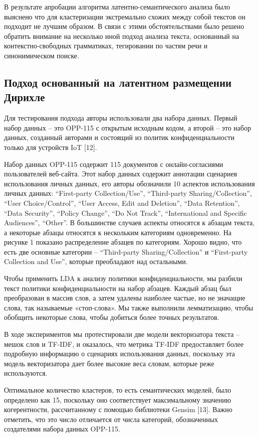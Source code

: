 \documentclass[../main]{subfiles}
\begin{document}
В результате апробации алгоритма латентно-семантического анализа было выяснено что для кластеризации экстремально схожих между собой текстов он  подходит не лучшим образом. В связи с этими обстоятельствами было решено обратить внимание на несколько иной подход анализа текста, основанный на контекстно-свободных грамматиках, тегировании по частям речи и синонимическом поиске.

\subsection{Подход основанный на латентном размещении Дирихле}
Для тестирования подхода авторы использовали два набора данных. Первый набор данных – это OPP-115 с открытым исходным кодом, а второй – это набор данных, созданный авторами и состоящий из политик конфиденциальности только для устройств IoT [12].

Набор данных OPP-115 содержит 115 документов с онлайн-согласиями пользователей веб-сайта. Этот набор данных содержит аннотации сценариев использования личных данных, его авторы обозначили 10 аспектов использования личных данных: “First-party Collection/Use”, “Third-party Sharing/Col\-lec\-ti\-on”, “User Choice/Control”, “User Access, Edit and Deletion”, “Data Re\-ten\-ti\-on”, “Data Security”, “Policy Change”, “Do Not Track”, “International and Specific Audiences”, “Other”. В большинстве случаев аспекты относятся к абзацам текста, а некоторые абзацы относятся к нескольким категориям одновременно. На рисунке 1 показано распределение абзацев по категориям. Хорошо видно, что есть две основные категории – “Third-party Sharing/Collection” и “First-party Collection and Use”, которые преобладают над остальными.

Чтобы применить LDA к анализу политики конфиденциальности, мы разбили текст политики конфиденциальности на набор абзацев. Каждый абзац был преобразован в массив слов, а затем удалены наиболее частые, но не значащие слова, так называемые «стоп-слова». Мы также выполнили лемматизацию, чтобы обобщить некоторые слова, чтобы добиться более точных результатов.

В ходе экспериментов мы протестировали две модели векторизатора текста – мешок слов и TF-IDF, и оказалось, что метрика TF-IDF предоставляет более подробную информацию о сценариях использования данных, поскольку эта модель векторизатора дает более высокие веса словам, которые реже используются.

Оптимальное количество кластеров, то есть семантических моделей, было определено как 15, поскольку оно соответствует максимальному значению когерентности, рассчитанному с помощью библиотеки Gensim [13]. Важно отметить, что это число отличается от числа категорий, обозначенных создателями набора данных OPP-115.
\end{document}
